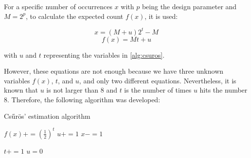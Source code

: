 For a specific number of occurrences $x$ with $p$ being the design parameter and $M = 2^p$, to calculate the expected count $f(x)$, it is used:

\begin{equation}
    x = (M +u)2^t-M
    \label{eq:csuros1}
\end{equation}
\begin{equation}
    f(x) = Mt + u
    \label{eq:csuros2}
\end{equation}

\noindent with $u$ and $t$ representing the variables in \autoref{alg:csuros}.

However, these equations are not enough because we have three unknown variables $f(x)$, $t$, and $u$, and only two different equations.
Nevertheless, it is known that $u$ is not larger than 8 and $t$ is the number of times $u$ hits the number 8.
Therefore, the following algorithm was developed:

\begin{algorithm}[ht!]
\caption{Csűrös' estimation algorithm}
\label{alg:csuros1}
\begin{algorithmic}


    
    \State $f(x) += (\frac{1}{2})^t$
    \State $u+=1$
    \State $x-=1$    

        \State $t +=1$
        \State $u = 0$
    \EndIf

 \EndWhile


\end{algorithmic}
\end{algorithm}




